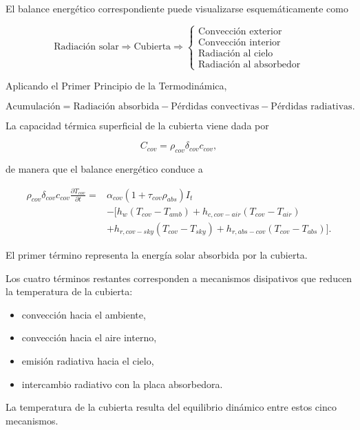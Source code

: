 El balance energético correspondiente puede visualizarse esquemáticamente como

\[
\boxed{
\text{Radiación solar}
\Longrightarrow
\boxed{\text{Cubierta}}
\Longrightarrow
\left\{
\begin{array}{c}
\text{Convección exterior}\\
\text{Convección interior}\\
\text{Radiación al cielo}\\
\text{Radiación al absorbedor}
\end{array}
\right.
}
\]

Aplicando el Primer Principio de la Termodinámica,

\[
\text{Acumulación}
=
\text{Radiación absorbida}
-
\text{Pérdidas convectivas}
-
\text{Pérdidas radiativas}.
\]

La capacidad térmica superficial de la cubierta viene dada por

\[
C_{cov}
=
\rho_{cov}\delta_{cov}c_{cov},
\]

de manera que el balance energético conduce a

\begin{equation}
\boxed{
\begin{aligned}
\rho_{cov}\delta_{cov}c_{cov}
\frac{\partial T_{cov}}{\partial t}
=
&
\alpha_{cov}(1+\tau_{cov}\rho_{abs})I_t
\\
&
-
\Big[
h_w(T_{cov}-T_{amb})
+
h_{c,cov-air}(T_{cov}-T_{air})
\\
&
+
h_{r,cov-sky}(T_{cov}-T_{sky})
+
h_{r,abs-cov}(T_{cov}-T_{abs})
\Big].
\end{aligned}
}
\end{equation}

\begin{tcolorbox}[title=Interpretación física,colback=blue!3,colframe=blue!60!black]

El primer término representa la energía solar absorbida por la cubierta.

Los cuatro términos restantes corresponden a mecanismos disipativos que reducen la temperatura de la cubierta:

\begin{itemize}

\item convección hacia el ambiente,

\item convección hacia el aire interno,

\item emisión radiativa hacia el cielo,

\item intercambio radiativo con la placa absorbedora.

\end{itemize}

La temperatura de la cubierta resulta del equilibrio dinámico entre estos cinco mecanismos.

\end{tcolorbox}

